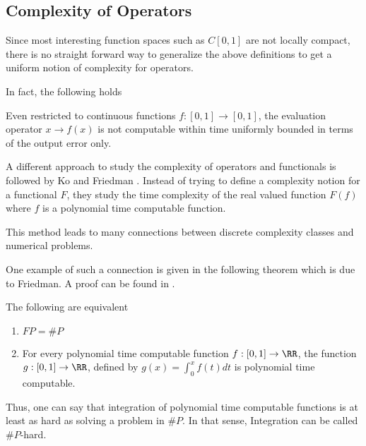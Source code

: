 	\subsection{Complexity of Operators}
		Since most interesting function spaces such as $C[0,1]$ are not locally compact,
		there is no straight forward way to generalize the above definitions to get
    a uniform notion of complexity for operators.

		In fact, the following holds
		\begin{theorem}
      Even restricted to continuous functions $f: [0,1] \to [0,1]$, the
      evaluation operator $x \to f(x)$ is not computable within time uniformly
      bounded in terms of the output error only.  
    \end{theorem}

	  A different approach to study the complexity of operators and functionals
    is followed by Ko and Friedman \cite{KoBook}.
    Instead of trying to define a complexity notion for a functional $F$, they
    study the time complexity of the real valued function $F(f)$ where $f$ is a
    polynomial time computable function.

		This  method leads to many connections between discrete complexity classes
    and numerical problems.

    One example of such a connection is given in the following theorem which is
    due to Friedman. A proof can be found in \cite{KoBook}.
		\begin{theorem}
			The following are equivalent
			\begin{enumerate}
				\item $FP = \#P$
				\item For every polynomial time computable function $f: [0,1] \to \RR$, the function
					$g: [0,1] \to \RR$, defined by $g(x) = \int_0^x f(t) dt$ is polynomial time computable.
			\end{enumerate} 
		\end{theorem}
		Thus, one can say that integration of polynomial time computable functions is at
    least as hard as solving a problem in $\#P$.
    In that sense, Integration can be called $\#P$-hard.


